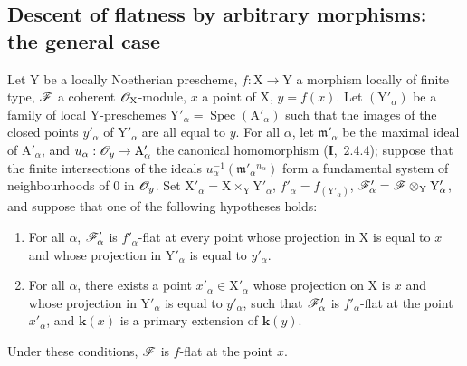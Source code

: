 \subsection{Descent of flatness by arbitrary morphisms: the general case}
\label{subsection:IV.11.5}

\begin{theorem}[11.5.1]
\label{IV.11.5.1}
Let $\mathrm{Y}$ be a locally Noetherian prescheme, $f:\mathrm{X}\to\mathrm{Y}$ a
morphism locally of finite type, $\mathscr{F}$ a coherent $\mathscr{O}_\mathrm{X}$-module, $x$ a point of $\mathrm{X}$, $y=f(x)$. Let $(\mathrm{Y}'_\alpha)$
be a family of local $\mathrm{Y}$-preschemes $\mathrm{Y}'_\alpha=\operatorname{Spec}(\mathrm{A}'_\alpha)$ such that the images of the closed points $y'_\alpha$
of $\mathrm{Y}'_\alpha$ are all equal to $y$. For all $\alpha$, let $\mathfrak{m}'_\alpha$ be the maximal ideal of $\mathrm{A}'_\alpha$, and $u_\alpha:\mathscr{O}_y\to\mathrm{A}'_\alpha$
the canonical homomorphism (\textbf{I},~$2.4.4$); suppose that the finite intersections of the ideals
$u_\alpha^{-1}(\mathfrak{m}'_\alpha{}^{n_\alpha})$
form a fundamental system of neighbourhoods of $0$ in $\mathscr{O}_y$. Set $\mathrm{X}'_\alpha=\mathrm{X}\times_\mathrm{Y}\mathrm{Y}'_\alpha$, $f'_\alpha=f_{(\mathrm{Y}'_\alpha)}$,
$\mathscr{F}'_\alpha=\mathscr{F}\otimes_\mathrm{Y}\mathrm{Y}'_\alpha$, and suppose that \textup{one} of the following hypotheses holds:
\begin{enumerate}[label=\textup{(\roman*)}]
  \item For all $\alpha$, $\mathscr{F}'_\alpha$ is $f'_\alpha$-flat at \textup{every} point whose projection in $\mathrm{X}$ is equal
  to $x$ and whose projection in $\mathrm{Y}'_\alpha$ is equal to $y'_\alpha$.
  \item For all $\alpha$, there exists a point $x'_\alpha\in\mathrm{X}'_\alpha$ whose projection on $\mathrm{X}$ is $x$ and whose projection in $\mathrm{Y}'_\alpha$
  is equal to $y'_\alpha$, such that $\mathscr{F}'_\alpha$ is $f'_\alpha$-flat at the point $x'_\alpha$, and $\boldsymbol{k}(x)$ is a primary extension of $\boldsymbol{k}(y)$.
\end{enumerate}

Under these conditions, $\mathscr{F}$ is $f$-flat at the point $x$.
\end{theorem}

